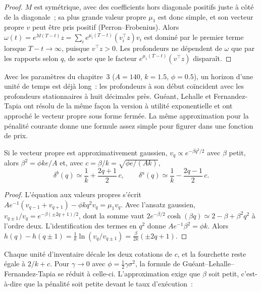 \begin{proof}
$M$ est symétrique, avec des coefficients hors diagonale positifs juste à côté de la diagonale~; sa plus grande valeur propre $\mu_1$ est donc simple, et son vecteur propre $v$ peut
être pris positif (Perron--Frobenius). Alors $\omega(t)=e^{M(T-t)}z=\sum_ie^{\mu_i(T-t)}(v_i^\top z)v_i$ est dominé par le premier terme lorsque $T-t\to\infty$,
puisque $v^\top z>0$. Les profondeurs ne dépendent de $\omega$ que par les rapports selon $q$, de sorte que le facteur $e^{\mu_1(T-t)}(v^\top z)$ disparaît.
\end{proof}

Avec les paramètres du chapitre~3 ($A=140$, $k=1.5$, $\phi=0.5$), un horizon d'une unité de temps est déjà long~: les profondeurs à son début coïncident avec les
profondeurs stationnaires à huit décimales près. Guéant, Lehalle et Fernandez-Tapia ont résolu de la même façon la version à utilité exponentielle et ont approché
le vecteur propre sous forme fermée. La même approximation pour la pénalité courante donne une formule assez simple pour figurer dans une fonction de prix.

\begin{proposition}\label{prop:hf:extensions-of-the-inventory-framework:closed}
Si le vecteur propre est approximativement gaussien, $v_q\propto e^{-\beta q^2/2}$ avec $\beta$ petit, alors $\beta^2=\phi ke/A$ et, avec
$c=\beta/k=\sqrt{\phi e/(Ak)}$,
\[
\delta^b(q)\simeq\frac1k+\frac{2q+1}{2}\,c,\qquad \delta^a(q)\simeq\frac1k-\frac{2q-1}{2}\,c .
\]
\end{proposition}

\begin{proof}
L'équation aux valeurs propres s'écrit $Ae^{-1}(v_{q-1}+v_{q+1})-\phi kq^2v_q=\mu_1v_q$. Avec l'ansatz gaussien, $v_{q\pm1}/v_q=e^{-\beta(\pm2q+1)/2}$, dont la somme
vaut $2e^{-\beta/2}\cosh(\beta q)\simeq2-\beta+\beta^2q^2$ à l'ordre deux. L'identification des termes en $q^2$ donne $Ae^{-1}\beta^2=\phi k$. Alors
$h(q)-h(q\pm1)=\tfrac1k\ln(v_q/v_{q\pm1})=\tfrac{\beta}{2k}(\pm2q+1)$.
\end{proof}

Chaque unité d'inventaire décale les deux cotations de $c$, et la fourchette reste égale à $2/k+c$. Pour $\gamma\to0$ avec $\phi=\tfrac12\gamma\sigma^2$, la
formule de Guéant--Lehalle--Fernandez-Tapia se réduit à celle-ci. L'approximation exige que $\beta$ soit petit, c'est-à-dire que la pénalité soit petite devant le taux d'exécution~:

